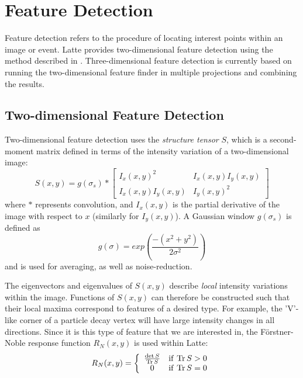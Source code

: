 \section{Feature Detection}\label{sec:latte_feature_detection}
Feature detection refers to the procedure of locating interest points within an image or event. Latte provides two-dimensional feature detection using the method described in \citep{Morgan2010}. Three-dimensional feature detection is currently based on running the two-dimensional feature finder in multiple projections and combining the results.

\subsection{Two-dimensional Feature Detection}
Two-dimensional feature detection uses the \emph{structure tensor} $S$, which is a second-moment matrix defined in terms of the intensity variation of a two-dimensional image:\citep{Morgan2010}
\begin{equation}\label{eqn:structure_tensor}
    S(x,y) = g(\sigma_s) \ast \left[ \begin{array}{cc} I_x(x,y)^2 & I_x(x,y)I_y(x,y) \\ I_x(x,y)I_y(x,y) & I_y(x,y)^2 \end{array} \right]
\end{equation}
where $\ast$ represents convolution, and $I_x(x,y)$ is the partial derivative of the image with respect to $x$ (similarly for $I_y(x,y)$). A Gaussian window $g(\sigma_s)$ is defined as
\begin{equation}\label{eqn:feature_det_gaussian_window}
    g(\sigma) = exp\left( \frac{-(x^2 + y^2)}{2\sigma^2} \right)
\end{equation}
and is used for averaging, as well as noise-reduction.

The eigenvectors and eigenvalues of $S(x,y)$ describe \emph{local} intensity variations within the image. Functions of $S(x,y)$ can therefore be constructed such that their local maxima correspond to features of a desired type. For example, the 'V'-like corner of a particle decay vertex will have large intensity changes in all directions. Since it is this type of feature that we are interested in, the F\"orstner-Noble response function $R_N(x,y)$ is used within Latte:
\begin{equation}\label{eqn:forstner-noble}
    R_N(x,y) = \left\{ \begin{array}{cl} \frac{\det S}{\mathrm{Tr}\, S} & \mathrm{if~} \mathrm{Tr}\, S > 0 \\ 0 & \mathrm{if~} \mathrm{Tr}\, S = 0 \end{array} \right.
\end{equation}

